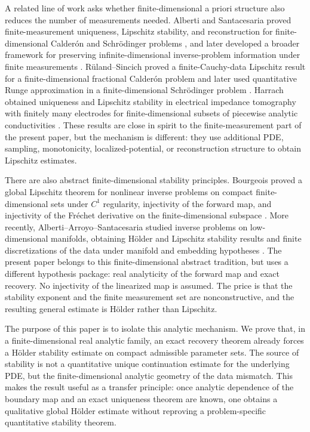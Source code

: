 \documentclass[12pt,oneside]{amsart}
\begin{document}
A related line of work asks whether finite-dimensional a priori structure also
reduces the number of measurements needed.  Alberti and Santacesaria proved
finite-measurement uniqueness, Lipschitz stability, and reconstruction for
finite-dimensional Calder\'on and Schr\"odinger problems
\cite{AlbertiSantacesaria2019}, and later developed a broader framework for
preserving infinite-dimensional inverse-problem information under finite
measurements \cite{AlbertiSantacesaria2022}.  R\"uland--Sincich proved a
finite-Cauchy-data Lipschitz result for a finite-dimensional fractional
Calder\'on problem and later used quantitative Runge approximation in a
finite-dimensional Schr\"odinger problem
\cite{RulandSincich2019,RulandSincich2022}.  Harrach obtained uniqueness and
Lipschitz stability in electrical impedance tomography with finitely many
electrodes for finite-dimensional subsets of piecewise analytic conductivities
\cite{Harrach2019}.  These results are close in spirit to the finite-measurement
part of the present paper, but the mechanism is different: they use additional
PDE, sampling, monotonicity, localized-potential, or reconstruction structure to
obtain Lipschitz estimates.

There are also abstract finite-dimensional stability principles.  Bourgeois
proved a global Lipschitz theorem for nonlinear inverse problems on compact
finite-dimensional sets under \(C^1\) regularity, injectivity of the forward
map, and injectivity of the Fr\'echet derivative on the finite-dimensional
subspace \cite{Bourgeois2013}.  More recently,
Alberti--Arroyo--Santacesaria studied inverse problems on low-dimensional
manifolds, obtaining H\"older and Lipschitz stability results and finite
discretizations of the data under manifold and embedding hypotheses
\cite{AlbertiArroyoSantacesaria2023}.  The present paper belongs to this
finite-dimensional abstract tradition, but uses a different hypothesis package:
real analyticity of the forward map and exact recovery.  No injectivity of the
linearized map is assumed.  The price is that the stability exponent and the
finite measurement set are nonconstructive, and the resulting general estimate
is H\"older rather than Lipschitz.

The purpose of this paper is to isolate this analytic mechanism.  We prove that,
in a finite-dimensional real analytic family, an exact recovery theorem already
forces a H\"older stability estimate on compact admissible parameter sets.  The
source of stability is not a quantitative unique continuation estimate for the
underlying PDE, but the finite-dimensional analytic geometry of the data
mismatch.  This makes the result useful as a transfer principle: once analytic
dependence of the boundary map and an exact uniqueness theorem are known, one
obtains a qualitative global H\"older estimate without reproving a
problem-specific quantitative stability theorem.
\end{document}

